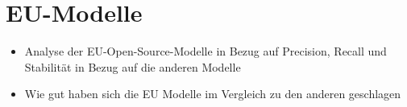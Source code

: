 \section{EU-Modelle}\label{sec:eu-modelle}

\begin{itemize}
    \item Analyse der EU-Open-Source-Modelle in Bezug auf Precision, Recall und Stabilität in Bezug auf die anderen Modelle
    \item Wie gut haben sich die EU Modelle im Vergleich zu den anderen geschlagen
\end{itemize}